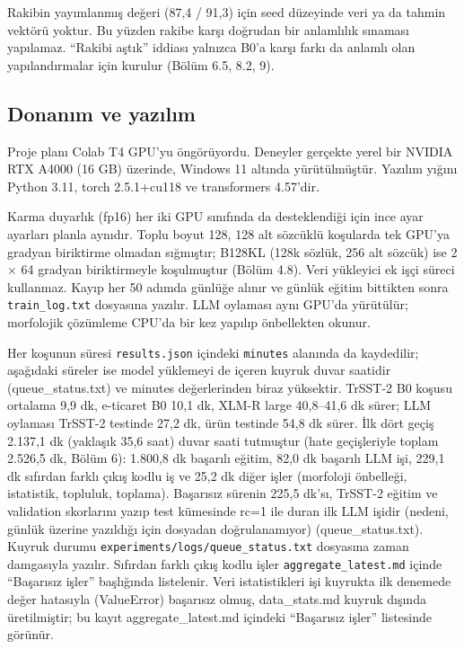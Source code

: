 \documentclass[11pt]{article}
\begin{document}
Rakibin yayımlanmış değeri (87,4 / 91,3) için seed düzeyinde veri ya da tahmin vektörü yoktur. Bu yüzden rakibe karşı doğrudan bir anlamlılık sınaması yapılamaz. ``Rakibi aştık'' iddiası yalnızca B0'a karşı farkı da anlamlı olan yapılandırmalar için kurulur (Bölüm 6.5, 8.2, 9).

\subsection{Donanım ve yazılım}

Proje planı Colab T4 GPU'yu öngörüyordu. Deneyler gerçekte yerel bir NVIDIA RTX A4000 (16 GB) üzerinde, Windows 11 altında yürütülmüştür. Yazılım yığını Python 3.11, torch 2.5.1+cu118 ve transformers 4.57'dir.

Karma duyarlık (fp16) her iki GPU sınıfında da desteklendiği için ince ayar ayarları planla aynıdır. Toplu boyut 128, 128 alt sözcüklü koşularda tek GPU'ya gradyan biriktirme olmadan sığmıştır; B128KL (128k sözlük, 256 alt sözcük) ise 2 $\times$ 64 gradyan biriktirmeyle koşulmuştur (Bölüm 4.8). Veri yükleyici ek işçi süreci kullanmaz. Kayıp her 50 adımda günlüğe alınır ve günlük eğitim bittikten sonra \texttt{train\_\allowbreak{}\allowbreak{}log.\allowbreak{}\allowbreak{}txt} dosyasına yazılır. LLM oylaması aynı GPU'da yürütülür; morfolojik çözümleme CPU'da bir kez yapılıp önbellekten okunur.

Her koşunun süresi \texttt{results.\allowbreak{}\allowbreak{}json} içindeki \texttt{minutes} alanında da kaydedilir; aşağıdaki süreler ise model yüklemeyi de içeren kuyruk duvar saatidir (queue\_\allowbreak{}status.txt) ve minutes değerlerinden biraz yüksektir. TrSST-2 B0 koşusu ortalama 9,9 dk, e-ticaret B0 10,1 dk, XLM-R large 40,8–41,6 dk sürer; LLM oylaması TrSST-2 testinde 27,2 dk, ürün testinde 54,8 dk sürer. İlk dört geçiş 2.137,1 dk (yaklaşık 35,6 saat) duvar saati tutmuştur (hate geçişleriyle toplam 2.526,5 dk, Bölüm 6): 1.800,8 dk başarılı eğitim, 82,0 dk başarılı LLM işi, 229,1 dk sıfırdan farklı çıkış kodlu iş ve 25,2 dk diğer işler (morfoloji önbelleği, istatistik, topluluk, toplama). Başarısız sürenin 225,5 dk'sı, TrSST-2 eğitim ve validation skorlarını yazıp test kümesinde rc=1 ile duran ilk LLM işidir (nedeni, günlük üzerine yazıldığı için dosyadan doğrulanamıyor) (queue\_\allowbreak{}status.txt). Kuyruk durumu \texttt{experiments/\allowbreak{}\allowbreak{}logs/\allowbreak{}\allowbreak{}queue\_\allowbreak{}\allowbreak{}status.\allowbreak{}\allowbreak{}txt} dosyasına zaman damgasıyla yazılır. Sıfırdan farklı çıkış kodlu işler \texttt{aggregate\_\allowbreak{}\allowbreak{}latest.\allowbreak{}\allowbreak{}md} içinde ``Başarısız işler'' başlığında listelenir. Veri istatistikleri işi kuyrukta ilk denemede değer hatasıyla (ValueError) başarısız olmuş, data\_\allowbreak{}stats.md kuyruk dışında üretilmiştir; bu kayıt aggregate\_\allowbreak{}latest.md içindeki ``Başarısız işler'' listesinde görünür.
\end{document}
